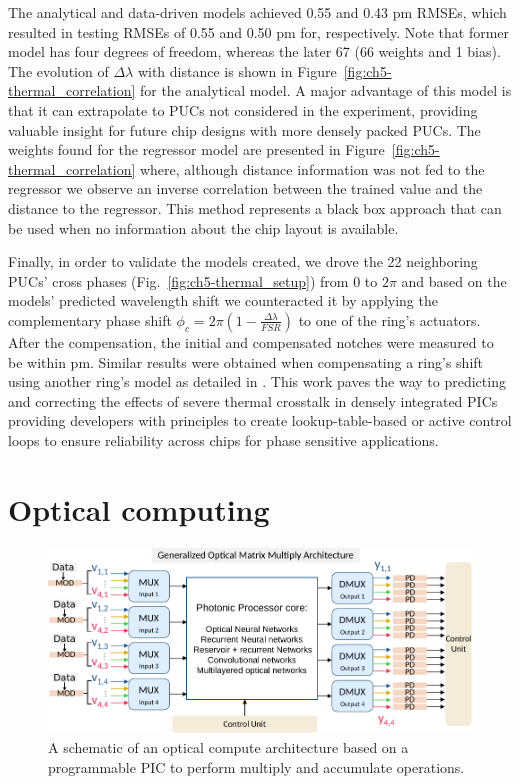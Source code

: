 The analytical and data-driven models achieved 0.55 and 0.43 pm RMSEs, which resulted in testing RMSEs of 0.55 and 0.50 pm for, respectively.
Note that former model has four degrees of freedom, whereas the later 67 (66 weights and 1 bias).
The evolution of \(\Delta \lambda\) with distance is shown in Figure~\ref{fig:ch5-thermal_correlation} for the analytical model.
A major advantage of this model is that it can extrapolate to PUCs not considered in the experiment, providing valuable insight for future chip designs with more densely packed PUCs.
The weights found for the regressor model are presented in Figure~\ref{fig:ch5-thermal_correlation} where, although distance information was not fed to the regressor we observe an inverse correlation between the trained value and the distance to the regressor.
This method represents a black box approach that can be used when no information about the chip layout is available.

Finally, in order to validate the models created, we drove the 22 neighboring PUCs' cross phases (Fig.~\ref{fig:ch5-thermal_setup}) from \(0\) to \(2\pi\) and based on the models' predicted wavelength shift we counteracted it by applying the complementary phase shift \(\phi_c = 2 \pi(1-\frac{\Delta \lambda}{FSR})\) to one of the ring's actuators.
After the compensation, the initial and compensated notches were measured to be within  pm.
Similar results were obtained when compensating a ring's shift using another ring's model as detailed in \cite{teofilovic_thermal_2024}.
This work paves the way to predicting and correcting the effects of severe thermal crosstalk in densely integrated PICs providing developers with principles to create lookup-table-based or active control loops to ensure reliability across chips for phase sensitive applications.
\section{Optical computing}\label{sec:optical_computing} %

\begin{figure}
	\begin{center}
		\includegraphics{figures/ch5-compute_schematic.pdf}
	\end{center}
	\caption{A schematic of an optical compute architecture based on a programmable PIC to perform multiply and accumulate operations.}\label{fig:ch5-compute_schematic}
\end{figure}

